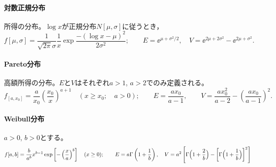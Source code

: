 \paragraph{対数正規分布}所得の分布。$\log x$が正規分布$N[\mu,\sigma]$に従うとき，
\begin{equation}
 f[\mu,\sigma]=\frac1{\sqrt{2\pi}\sigma}\frac1x\exp\frac{-(\log x-\mu)^2}{2\sigma^2};\qquad
E=\ee^{\mu+\sigma^2/2},\quad
V=\ee^{2\mu+2\sigma^2}-\ee^{2\mu+\sigma^2}.
\end{equation}
\paragraph{Pareto分布}高額所得の分布。$E$と$V$はそれぞれ$a>1$, $a>2$でのみ定義される。
\begin{equation}
  f_{[a,x_0]}=\frac{a}{x_0}\left(\frac{x_0}{x}\right)^{a+1}\quad(x\ge x_0;\quad a>0);\qquad
E=\frac{a x_0}{a-1},\qquad
V=\frac{a x_0^2}{a-2}-\left(\frac{a x_0}{a-1}\right)^2.
\end{equation}
\paragraph{Weibull分布}$a>0$, $b>0$とする。
\begin{equation}
 f[a,b]=\frac{b}{a^b}x^{b-1}\exp\left[-\left(\frac xa\right)^b\right]\quad(x\ge0);\qquad
E=a\Gamma\left(1+\frac1b\right),\quad
V=a^2\left[\Gamma\Bigl(1+\frac2b\Bigr)-\left[\Gamma\Bigl(1+\frac1b\Bigr)\right]^2\right]
\end{equation}
